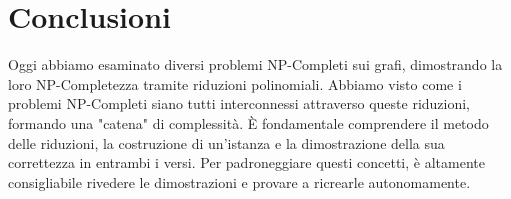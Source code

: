 \documentclass[a4paper]{article}
\theoremstyle{definition} %
\theoremstyle{definition} %
\begin{document}
\section{Conclusioni}
Oggi abbiamo esaminato diversi problemi NP-Completi sui grafi, dimostrando la loro NP-Completezza tramite riduzioni polinomiali. Abbiamo visto come i problemi NP-Completi siano tutti interconnessi attraverso queste riduzioni, formando una "catena" di complessità. È fondamentale comprendere il metodo delle riduzioni, la costruzione di un'istanza e la dimostrazione della sua correttezza in entrambi i versi. Per padroneggiare questi concetti, è altamente consigliabile rivedere le dimostrazioni e provare a ricrearle autonomamente.
\end{document}
